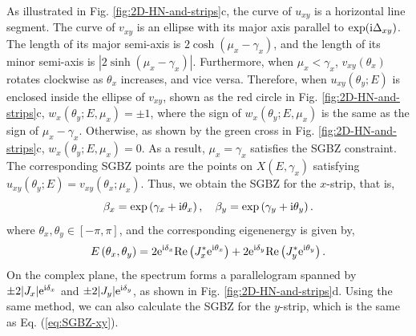 \documentclass[pdflatex,sn-nature, iicol]{sn-jnl}%
\theoremstyle{thmstyleone}%
\theoremstyle{thmstyletwo}%
\theoremstyle{thmstylethree}%
\begin{document}
As illustrated in Fig. \ref{fig:2D-HN-and-strips}c, the curve of
$u_{xy}$ is a horizontal line segment. The curve of $v_{xy}$ is
an ellipse with its major axis parallel to $\exp(\mathrm{i}\Delta_{xy})$.
The length of its major semi-axis is $2\cosh(\mu_{x}-\gamma_{x})$,
and the length of its minor semi-axis is $|2\sinh(\mu_{x}-\gamma_{x})|$.
Furthermore, when $\mu_{x}<\gamma_{x}$, $v_{xy}(\theta_{x})$ rotates
clockwise as $\theta_{x}$ increases, and vice versa. Therefore, when
$u_{xy}(\theta_{y};E)$ is enclosed inside the ellipse of $v_{xy}$,
shown as the red circle in Fig. \ref{fig:2D-HN-and-strips}c, $w_{x}(\theta_{y};E,\mu_{x})=\pm1$,
where the sign of $w_{x}(\theta_{y};E,\mu_{x})$ is the same as the
sign of $\mu_{x}-\gamma_{x}$. Otherwise, as shown by the green cross
in Fig. \ref{fig:2D-HN-and-strips}c, $w_{x}(\theta_{y};E,\mu_{x})=0$.
As a result, $\mu_{x}=\gamma_{x}$ satisfies the SGBZ constraint.
The corresponding SGBZ points are the points on $X(E,\gamma_{x})$
satisfying $u_{xy}(\theta_{y};E)=v_{xy}(\theta_{x};\mu_{x})$. Thus,
we obtain the SGBZ for the $x$-strip, that is, 
\begin{equation}
\beta_{x}=\exp\left(\gamma_{x}+\mathrm{i}\theta_{x}\right),\quad\beta_{y}=\exp\left(\gamma_{y}+\mathrm{i}\theta_{y}\right).\label{eq:SGBZ-xy}
\end{equation}
where $\theta_{x},\theta_{y}\in[-\pi,\pi]$, and the corresponding
eigenenergy is given by, 
\begin{equation}
E\left(\theta_{x},\theta_{y}\right)=2\mathrm{e}^{\mathrm{i}\delta_{x}}\text{Re}\left(J_{x}^{*}\mathrm{e}^{\mathrm{i}\theta_{x}}\right)+2\mathrm{e}^{\mathrm{i}\delta_{y}}\text{Re}\left(J_{y}^{*}\mathrm{e}^{\mathrm{i}\theta_{y}}\right).\label{eq:SGBZ-xy-E}
\end{equation}
On the complex plane, the spectrum forms a parallelogram spanned by
$\pm2|J_{x}|\mathrm{e}^{\mathrm{i}\delta_{x}}$ and $\pm2|J_{y}|\mathrm{e}^{\mathrm{i}\delta_{y}}$,
as shown in Fig. \ref{fig:2D-HN-and-strips}d. Using the same method,
we can also calculate the SGBZ for the $y$-strip, which is the same
as Eq. (\ref{eq:SGBZ-xy}).
\end{document}
